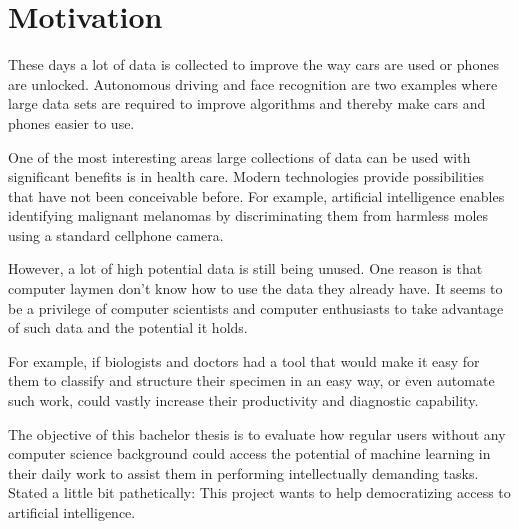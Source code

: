 \chapter{Motivation}

These days a lot of data is collected to improve the way cars are used or phones are unlocked. Autonomous driving and face recognition are two examples where large data sets are required to improve algorithms and thereby make cars and phones easier to use. 

One of the most interesting areas large collections of data can be
used with significant benefits is in health care. Modern
technologies provide
possibilities that have not been conceivable before. 
For example, artificial
intelligence enables identifying malignant melanomas by
discriminating them from harmless moles using a standard cellphone camera.

However, a lot of high potential data is still being unused. 
One reason is that computer laymen don't know how to use the data they already have. 
It seems to be a privilege of computer scientists and computer enthusiasts to take advantage of such data and the potential it holds. 

For example, if biologists and doctors had a tool that would 
make it easy for them to classify and structure their specimen
in an easy way, or even automate such work, could vastly increase
their productivity and diagnostic capability.

The objective of this bachelor thesis is to evaluate how regular
users without any computer science background could access the
potential of machine learning in their daily work to assist them
in performing intellectually demanding tasks. Stated a little bit pathetically: This project wants to help democratizing access to  artificial intelligence.